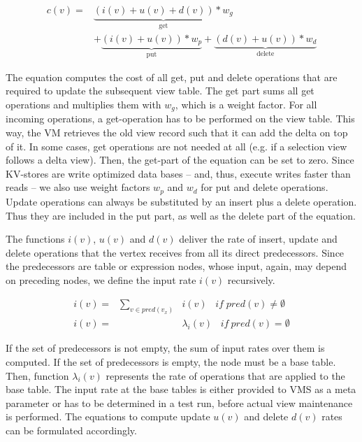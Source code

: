 \begin{equation} 
\begin{aligned} 	   
   c(v)=&\underbrace{(i(v)+u(v)+d(v))*w_g}_\text{get} \\ 
   &+\underbrace{(i(v)+u(v))*w_p}_\text{put} +\underbrace{(d(v)+u(v))*w_d}_\text{delete}
\end{aligned}
\end{equation}

The equation computes the cost of all get, put and delete operations 
that are required to update the subsequent view table. The get part sums 
all get operations and multiplies them with $w_g$, which is a weight 
factor. For all incoming operations, a get-operation has to be performed 
on the view table. This way, the VM retrieves the old view record such 
that it can add the delta on top of it. In some cases, get operations 
are not needed at all (e.g. if a selection view follows a delta view). 
Then, the get-part of the equation can be set to zero. Since KV-stores 
are write optimized data bases -- and, thus, execute writes faster than 
reads -- we also use weight factors $w_p$ and $w_d$ for put and delete 
operations. Update operations can always be substituted by an insert 
plus a delete operation. Thus they are included in the put part, as well 
as the delete part of the equation. 

The functions $i(v)$, $u(v)$ and $d(v)$ deliver the rate of insert, 
update and delete operations that the vertex receives from all its 
direct predecessors. Since the predecessors are table or expression 
nodes, whose input, again, may depend on preceding nodes, we define the 
input rate $i(v)$ recursively. 



\begin{equation} 
\begin{aligned} 	   
	i(v)=& \sum_{v \in pred(v_x)}&i(v)\;\;\; if \; pred(v) \neq \emptyset \\
	i(v)=& &\lambda_i(v)\;\;\; if \: pred(v) = \emptyset
\end{aligned}
\end{equation}


If the set of predecessors is not empty, the sum of input rates over them
is computed. If the set of predecessors is empty, the node must be a base 
table. Then, function $\lambda_i(v)$ represents the rate of operations that 
are applied to the base table. The input rate at the base tables
is either provided to VMS as a meta parameter or has to be determined in
a test run, before actual view maintenance is performed. The equations
to compute update $u(v)$ and delete $d(v)$ rates can be formulated accordingly.

